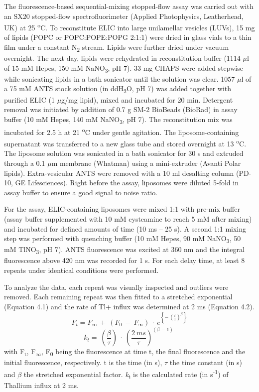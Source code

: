 The fluorescence-based sequential-mixing stopped-flow assay was carried
out with an SX20 stopped-flow spectrofluorimeter (Applied Photophysics,
Leatherhead, UK) at 25 \textsuperscript{o}C. To reconstitute ELIC into
large unilamellar vesicles (LUVs), 15 mg of lipids (POPC or
POPC:POPE:POPG 2:1:1) were dried in glass vials to a thin film under a
constant N\textsubscript{2} stream. Lipids were further dried under
vacuum overnight. The next day, lipids were rehydrated in reconstitution
buffer (1114 $\mu$l of 15 mM Hepes, 150 mM NaNO\textsubscript{3}, pH 7). 33
mg CHAPS were added stepwise while sonicating lipids in a bath sonicator
until the solution was clear. 1057 $\mu$l of a 75 mM ANTS stock solution (in
ddH\textsubscript{2}O, pH 7) was added together with purified ELIC (1
$\mu$g/mg lipid), mixed and incubated for 20 min. Detergent removal was
initiated by addition of 0.7 g SM-2 BioBeads (BioRad) in assay buffer
(10 mM Hepes, 140 mM NaNO\textsubscript{3}, pH 7). The reconstitution
mix was incubated for 2.5 h at 21 \textsuperscript{o}C under gentle
agitation. The liposome-containing supernatant was transferred to a new
glass tube and stored overnight at 13 \textsuperscript{o}C. The liposome
solution was sonicated in a bath sonicator for 30 s and extruded through
a 0.1 $\mu$m membrane (Whatman) using a mini-extruder (Avanti Polar lipids).
Extra-vesicular ANTS were removed with a 10 ml desalting column (PD-10,
GE Lifesciences). Right before the assay, liposomes were diluted 5-fold
in assay buffer to ensure a good signal to noise ratio.

For the assay, ELIC-containing liposomes were mixed 1:1 with pre-mix
buffer (assay buffer supplemented with 10 mM cysteamine to reach 5 mM
after mixing) and incubated for defined amounts of time (10 ms -- 25 s).
A second 1:1 mixing step was performed with quenching buffer (10 mM
Hepes, 90 mM NaNO\textsubscript{3}, 50 mM TlNO\textsubscript{3}, pH 7).
ANTS fluorescence was excited at 360 nm and the integral fluorescence
above 420 nm was recorded for 1 s. For each delay time, at least 8
repeats under identical conditions were performed.

To analyze the data, each repeat was visually inspected and outliers
were removed. Each remaining repeat was then fitted to a stretched
exponential (Equation 4.1) and the rate of Tl+ influx was determined at 2
ms (Equation 4.2).
\begin{equation}
F_{t} = F_{\infty}\  + \ \left( F_{0}\  - \ F_{\infty} \right)\  \cdot \ e^{\left\{ - \ \left( \frac{t}{\tau} \right)^{\beta} \right\}}
\end{equation}
\begin{equation}
k_{t} = \ \left( \frac{\beta}{\tau} \right)\  \cdot \ \left( \frac{2\ ms}{\tau} \right)^{\left( \beta\  - 1 \right)}\ 
\end{equation}
with F\textsubscript{t}, F\textsubscript{$\infty$}, F\textsubscript{0} being
the fluorescence at time t, the final fluorescence and the initial
fluorescence, respectively. t is the time (in s), $\tau$ the time constant
(in s) and \emph{$\beta$} the stretched exponential factor.
\emph{k}\textsubscript{t} is the calculated rate (in
s\textsuperscript{-1}) of Thallium influx at 2 ms.

